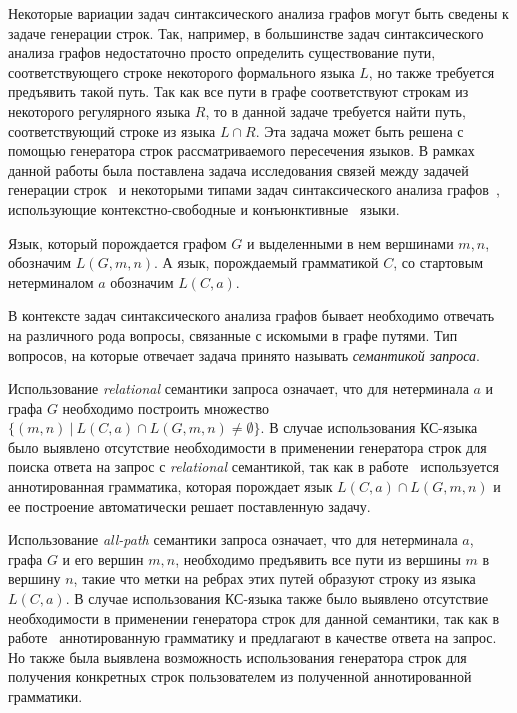 \documentclass [10pt] {article}
\begin{document}
Некоторые вариации задач синтаксического анализа графов могут быть сведены к задаче генерации строк. Так, например, в большинстве задач синтаксического анализа графов недостаточно просто определить существование пути, соответствующего строке некоторого формального языка $L$, но также требуется предъявить такой путь. Так как все пути в графе соответствуют строкам из некоторого регулярного языка $R$, то в данной задаче требуется найти путь, соответствующий строке из языка $L \cap R$. Эта задача может быть решена с помощью генератора строк рассматриваемого пересечения языков. В рамках данной работы была поставлена задача исследования связей между задачей генерации строк~\cite{azimov-spbu-Okhotin} и некоторыми типами задач синтаксического анализа графов~\cite{azimov-spbu-hellings1, azimov-spbu-hellings2}, использующие контекстно-свободные и конъюнктивные~\cite{azimov-spbu-conj} языки.

Язык, который порождается графом $G$ и выделенными в нем вершинами $m, n$, обозначим $L(G, m, n)$. А язык, порождаемый грамматикой $C$, со стартовым нетерминалом $a$ обозначим $L(C,a)$.

В контексте задач синтаксического анализа графов бывает необходимо отвечать на различного рода вопросы, связанные с искомыми в графе путями. Тип вопросов, на которые отвечает задача принято называть \textit{семантикой запроса}.

Использование \textit{relational} семантики запроса означает, что для нетерминала $a$ и графа $G$ необходимо построить множество $\{(m, n)~|~L(C,a) \cap L(G,m,n) \neq \emptyset \}$. В случае использования КС-языка было выявлено отсутствие необходимости в применении генератора строк для поиска ответа на запрос с \textit{relational} семантикой, так как в работе~\cite{azimov-spbu-hellings2} используется аннотированная грамматика, которая порождает язык $L(C,a) \cap L(G,m,n)$ и ее построение автоматически решает поставленную задачу.

Использование \textit{all-path} семантики запроса означает, что для нетерминала $a$, графа $G$ и его вершин $m,n$, необходимо предъявить все пути из вершины $m$ в вершину $n$, такие что метки на ребрах этих путей образуют строку из языка $L(C,a)$. В случае использования КС-языка также было выявлено отсутствие необходимости в применении генератора строк для данной семантики, так как в работе~\cite{azimov-spbu-hellings2} аннотированную грамматику и предлагают в качестве ответа на запрос. Но также была выявлена возможность использования генератора строк для получения конкретных строк пользователем из полученной аннотированной грамматики.
\end{document}

